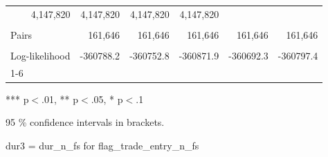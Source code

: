 \begin{table}[!h]
\begin{tabular}{llllll}
  \multicolumn{1}{r}{4,147,820} &
  \multicolumn{1}{r}{4,147,820} &
  \multicolumn{1}{r}{4,147,820} &
  \multicolumn{1}{r}{4,147,820} \\
\multicolumn{1}{l}{} &
  \multicolumn{1}{|r}{} &
  \multicolumn{1}{r}{} &
  \multicolumn{1}{r}{} &
  \multicolumn{1}{r}{} &
  \multicolumn{1}{r}{} \\
\multicolumn{1}{l}{Pairs} &
  \multicolumn{1}{|r}{161,646} &
  \multicolumn{1}{r}{161,646} &
  \multicolumn{1}{r}{161,646} &
  \multicolumn{1}{r}{161,646} &
  \multicolumn{1}{r}{161,646} \\
\multicolumn{1}{l}{} &
  \multicolumn{1}{|r}{} &
  \multicolumn{1}{r}{} &
  \multicolumn{1}{r}{} &
  \multicolumn{1}{r}{} &
  \multicolumn{1}{r}{} \\
\multicolumn{1}{l}{Log-likelihood} &
  \multicolumn{1}{|r}{-360788.2} &
  \multicolumn{1}{r}{-360752.8} &
  \multicolumn{1}{r}{-360871.9} &
  \multicolumn{1}{r}{-360692.3} &
  \multicolumn{1}{r}{-360797.4} \\
\cline{1-6}
\end{tabular}

\footnotesize{
*** p$<$.01, ** p$<$.05, * p$<$.1

95 \% confidence intervals in brackets.

dur3 = dur\_n\_fs for flag\_trade\_entry\_n\_fs
}
\end{table}
